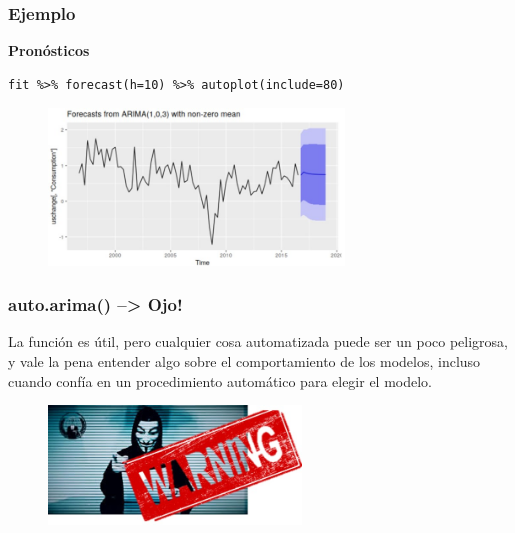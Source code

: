 \documentclass[10pt]{beamer}
\begin{document}




\begin{frame}[fragile]
\frametitle{Ejemplo}

\textbf{Pronósticos}

\lstset{language=r,label= ,caption= ,captionpos=b,numbers=none}
\begin{lstlisting}
fit %>% forecast(h=10) %>% autoplot(include=80)
\end{lstlisting}

\pause


\begin{figure}
\begin{center}
    \includegraphics[width=0.7\textwidth]{Imagen12.JPG}
\end{center}
\end{figure}

\end{frame}






\begin{frame}[fragile]
\frametitle{auto.arima() --> Ojo!}

La función  es útil, pero cualquier cosa automatizada puede ser un poco peligrosa, y vale la pena entender algo sobre el comportamiento de los modelos, incluso cuando confía en un procedimiento automático para elegir el modelo.



\begin{figure}
\begin{center}
    \includegraphics[width=0.6\textwidth]{Imagen13.JPG}
\end{center}
\end{figure}



\end{frame}
\end{document}
